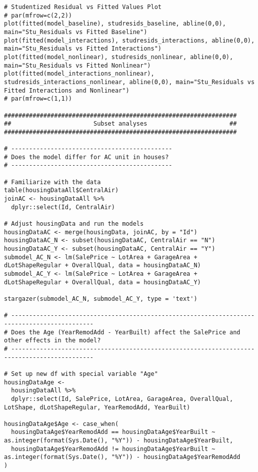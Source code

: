 \documentclass{article}
\begin{document}
\begin{tiny}
\begin{verbatim}
# Studentized Residual vs Fitted Values Plot
# par(mfrow=c(2,2))
plot(fitted(model_baseline), studresids_baseline, abline(0,0), main="Stu_Residuals vs Fitted Baseline")
plot(fitted(model_interactions), studresids_interactions, abline(0,0), main="Stu_Residuals vs Fitted Interactions")
plot(fitted(model_nonlinear), studresids_nonlinear, abline(0,0), main="Stu_Residuals vs Fitted Nonlinear")
plot(fitted(model_interactions_nonlinear), studresids_interactions_nonlinear, abline(0,0), main="Stu_Residuals vs Fitted Interactions and Nonlinear")
# par(mfrow=c(1,1))

#################################################################
##                       Subset analyses                       ##
#################################################################

# ---------------------------------------------
# Does the model differ for AC unit in houses?
# ---------------------------------------------

# Familiarize with the data
table(housingDataAll$CentralAir)
joinAC <- housingDataAll %>%
  dplyr::select(Id, CentralAir)

# Adjust housingData and run the models
housingDataAC <- merge(housingData, joinAC, by = "Id")
housingDataAC_N <- subset(housingDataAC, CentralAir == "N")
housingDataAC_Y <- subset(housingDataAC, CentralAir == "Y")
submodel_AC_N <- lm(SalePrice ~ LotArea + GarageArea + dLotShapeRegular + OverallQual, data = housingDataAC_N)
submodel_AC_Y <- lm(SalePrice ~ LotArea + GarageArea + dLotShapeRegular + OverallQual, data = housingDataAC_Y)

stargazer(submodel_AC_N, submodel_AC_Y, type = 'text')

# ---------------------------------------------------------------------------------------------
# Does the Age (YearRemodAdd - YearBuilt) affect the SalePrice and other effects in the model?
# ---------------------------------------------------------------------------------------------

# Set up new df with special variable "Age"
housingDataAge <- 
  housingDataAll %>%
  dplyr::select(Id, SalePrice, LotArea, GarageArea, OverallQual, LotShape, dLotShapeRegular, YearRemodAdd, YearBuilt)

housingDataAge$Age <- case_when(
  housingDataAge$YearRemodAdd == housingDataAge$YearBuilt ~ as.integer(format(Sys.Date(), "%Y")) - housingDataAge$YearBuilt,
  housingDataAge$YearRemodAdd != housingDataAge$YearBuilt ~ as.integer(format(Sys.Date(), "%Y")) - housingDataAge$YearRemodAdd
)


\end{verbatim}
\end{tiny}
\end{document}
